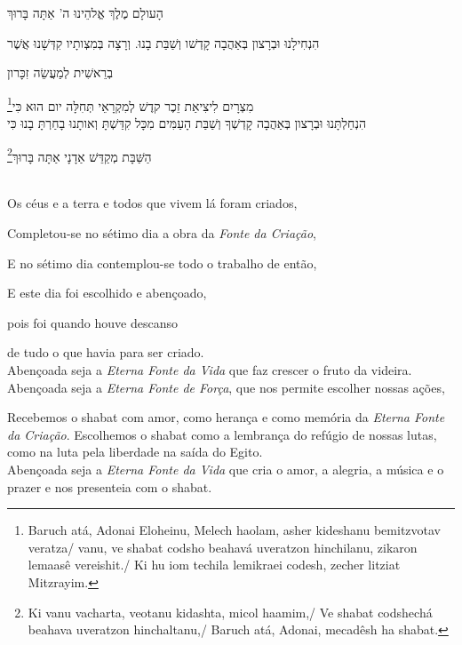 הָעולָם מֶלֶךְ אֱלהֵינוּ ה' אַתָּה בָּרוּךְ

הִנְחִילָנוּ וּבְרָצון בְּאַהֲבָה קָדְשׁו וְשַׁבַּת בָנוּ. וְרָצָה בְּמִצְותָיו קִדְּשָׁנוּ אֲשֶׁר

בְרֵאשִׁית לְמַעֲשֵׂה זִכָּרון

מִצְרָיִם לִיצִיאַת זֵכֶר קדֶשׁ לְמִקְרָאֵי תְּחִלָּה יום הוּא כִּי\footnote{Baruch atá, Adonai Eloheinu, Melech haolam, asher kideshanu bemitzvotav veratza/
vanu, ve shabat codsho beahavá uveratzon hinchilanu, zikaron lemaasê vereishit./
Ki hu iom techila lemikraei codesh, zecher litziat Mitzrayim.}\\[10pt]

הִנְחַלְתָּנוּ וּבְרָצון בְּאַהֲבָה קָדְשְׁךָ וְשַׁבַּת הָעַמִּים מִכָּל קִדַּשְׁתָּ וְאותָנוּ בָחַרְתָּ בָנוּ כִּי

הַשַּׁבָּת מְקַדֵּשׁ אַדָנָי אַתָּה בָּרוּךְ\footnote{
Ki vanu vacharta, veotanu kidashta, micol haamim,/
Ve shabat codshechá beahava uveratzon hinchaltanu,/
Baruch atá, Adonai, mecadêsh ha shabat.}

\movetooddpage
\raggedright

\textsc{}\\[15pt]

Os céus e a terra e todos que vivem lá foram criados,

Completou-se no sétimo dia a obra da \emph{Fonte da Criação},

E no sétimo dia contemplou-se todo o trabalho de então,

E este dia foi escolhido e abençoado,

pois foi quando houve descanso

de tudo o que havia para ser criado.\\[10pt]

Abençoada seja a \emph{Eterna Fonte da Vida} que faz crescer o fruto da videira.\\[10pt]

Abençoada seja a \emph{Eterna Fonte de Força}, que nos permite escolher nossas ações,

Recebemos o shabat com amor, como herança e como memória da \emph{Eterna
Fonte da Criação}. Escolhemos o shabat como a lembrança do refúgio de
nossas lutas, como na luta pela liberdade na saída do Egito.\\[10pt]

Abençoada seja a \emph{Eterna Fonte da Vida} que cria o amor, a alegria,
a música e o prazer e nos presenteia com o shabat.

\movetoevenpage
\raggedleft

